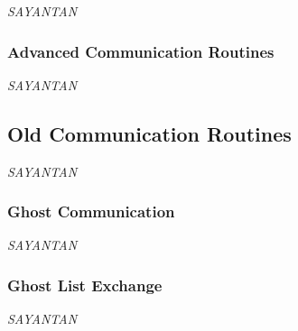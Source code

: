 {\it SAYANTAN}

\subsubsection{Advanced Communication Routines}

{\it SAYANTAN}

\subsection{Old Communication Routines}

{\it SAYANTAN}

\subsubsection{Ghost Communication}

{\it SAYANTAN}

\subsubsection{Ghost List Exchange}

{\it SAYANTAN}
